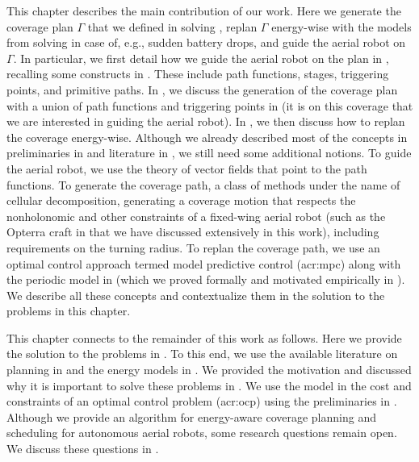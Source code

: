 This chapter describes the main contribution of our work. Here we generate the coverage plan $\Gamma$ that we defined in  solving , replan $\Gamma$ energy-wise with the models from  solving  in case of, e.g., sudden battery drops, and guide the aerial robot on $\Gamma$. In particular, we first detail how we guide the aerial robot on the plan in , recalling some constructs in . These include path functions, stages, triggering points, and primitive paths. In , we discuss the generation of the coverage plan with a union of path functions and triggering points in  (it is on this coverage that we are interested in guiding the aerial robot). In , we then discuss how to replan the coverage energy-wise. Although we already described most of the concepts in preliminaries in  and literature in , we still need some additional notions. To guide the aerial robot, we use the theory of vector fields that point to the path functions. To generate the coverage path, a class of methods under the name of cellular decomposition, generating a coverage motion that respects the nonholonomic and other constraints of a fixed-wing aerial robot (such as the Opterra craft in  that we have discussed extensively in this work), including requirements on the turning radius. To replan the coverage path, we use an optimal control approach termed model predictive control (\Gls{acr:mpc}) along with the periodic model in  (which we proved formally and motivated empirically in ). We describe all these concepts and contextualize them in the solution to the problems in this chapter. 

This chapter connects to the remainder of this work as follows. Here we provide the solution to the problems in . To this end, we use the available literature on planning in  and the energy models in . We provided the motivation and discussed why it is important to solve these problems in . We use the model in the cost and constraints of an optimal control problem (\Gls{acr:ocp}) using the preliminaries in . Although we provide an algorithm for energy-aware coverage planning and scheduling for autonomous aerial robots, some research questions remain open. We discuss these questions in .


